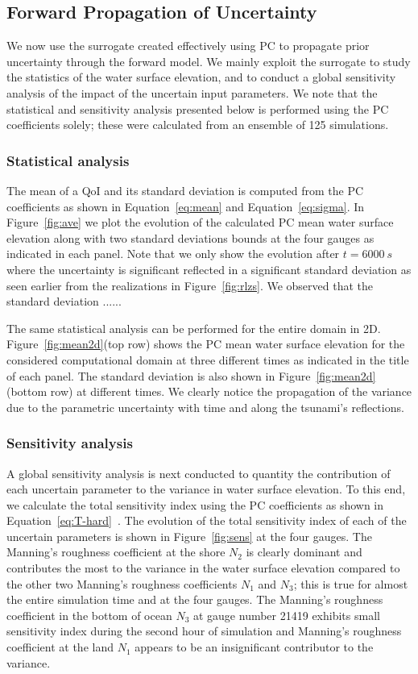 \subsection{Forward Propagation of Uncertainty}
\label{sec:forward}
We now use the surrogate created effectively using PC to propagate prior 
uncertainty through the forward model. We mainly exploit the surrogate 
to study the statistics of the water surface elevation, and to conduct 
a global sensitivity analysis of the impact of the uncertain input parameters.
We note that the statistical and sensitivity analysis presented below 
is performed using the PC coefficients solely; these were calculated
from an ensemble of 125 \geoclaw simulations.
\subsubsection{Statistical analysis}
The mean of a QoI and its standard deviation is computed
from the PC coefficients as shown in Equation~\eqref{eq:mean} and Equation~\eqref{eq:sigma}. 
In Figure~\ref{fig:ave} we plot the evolution of
the calculated PC mean water surface elevation along with two standard deviations
bounds at the four gauges as indicated in each panel.  
Note that we only show the evolution after $t=6000~s$ where the uncertainty is significant
reflected in a significant standard deviation as seen earlier from the realizations in Figure~\ref{fig:rlzs}.
We observed that the standard deviation ...... 

The same statistical analysis can be performed for the
entire domain in 2D. Figure~\ref{fig:mean2d}(top row) shows
the PC mean water surface elevation for the considered computational
domain at three different times as indicated in the title of each panel.
The standard deviation is also shown in Figure~\ref{fig:mean2d}(bottom row)
at different times. We clearly notice the propagation of the variance
due to the parametric uncertainty with time
and along the tsunami's reflections. 

        
\subsubsection{Sensitivity analysis}
A global sensitivity analysis is next conducted to quantity the contribution of each
uncertain parameter to the variance in water surface elevation. To this end, we calculate 
the total sensitivity index using the PC coefficients as shown in Equation~\eqref{eq:T-hard}~\citep{Alexanderian2012,Sudret,Crestaux}. The evolution of the total sensitivity index
of each of the uncertain parameters is shown in Figure~\ref{fig:sens} at the four gauges. 
The Manning's roughness coefficient at the shore $N_2$ is clearly dominant and contributes
the most to the variance in the water surface elevation compared to the other two 
Manning's roughness coefficients $N_1$ and $N_3$; this is true for almost the entire simulation time
and at the four gauges. The Manning's roughness coefficient
in the bottom of ocean $N_{3}$ at gauge number 21419 exhibits small sensitivity index 
during the second hour of simulation and Manning's roughness coefficient
at the land $N_1$ appears to be an insignificant contributor
to the variance.

